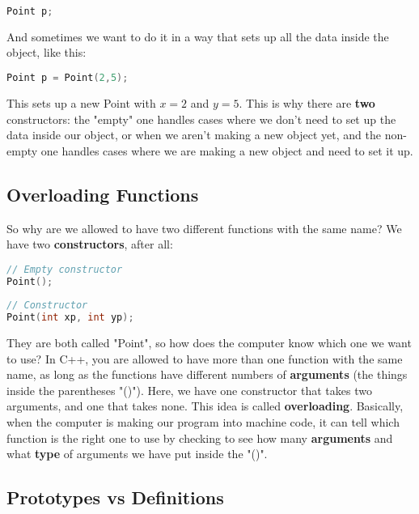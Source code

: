 \documentclass[a4paper,12pt]{article} %
\begin{document}
\vspace{5mm}
\begin{lstlisting}[language=C++]
Point p;
\end{lstlisting}

\noindent
And sometimes we want to do it in a way that sets up all the data inside the object, like this:

\vspace{5mm}
\begin{lstlisting}[language=C++]
Point p = Point(2,5);
\end{lstlisting}

\noindent
This sets up a new Point with $x = 2$ and $y = 5$. This is why there are \textbf{two} constructors: the "empty" one handles cases where we don't need to set up the data inside our object, or when we aren't making a new object yet, and the non-empty one handles cases where we are making a new object and need to set it up.

\subsection{Overloading Functions}

So why are we allowed to have two different functions with the same name? We have two \textbf{constructors}, after all:

\vspace{5mm}
\begin{lstlisting}[language=C++]
// Empty constructor
Point();
    
// Constructor
Point(int xp, int yp);
\end{lstlisting}

\noindent
They are both called "Point", so how does the computer know which one we want to use? In C++, you are allowed to have more than one function with the same name, as long as the functions have different numbers of \textbf{arguments} (the things inside the parentheses "()"). Here, we have one constructor that takes two arguments, and one that takes none. This idea is called \textbf{overloading}. Basically, when the computer is making our program into machine code, it can tell which function is the right one to use by checking to see how many \textbf{arguments} and what \textbf{type} of arguments we have put inside the "()". 

\clearpage

\subsection{Prototypes vs Definitions}
\end{document}
